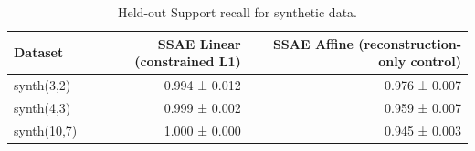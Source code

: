 \begin{table}[t]
\centering
\caption{Held-out Support recall for synthetic data.}
\label{tab:synthetic-support-recall}
\begin{tabular}{lrr}
\toprule
Dataset & SSAE Linear (constrained L1) & SSAE Affine (reconstruction-only control) \\
\midrule
synth(3,2) & 0.994 ± 0.012 & 0.976 ± 0.007 \\
synth(4,3) & 0.999 ± 0.002 & 0.959 ± 0.007 \\
synth(10,7) & 1.000 ± 0.000 & 0.945 ± 0.003 \\
\bottomrule
\end{tabular}
\end{table}
